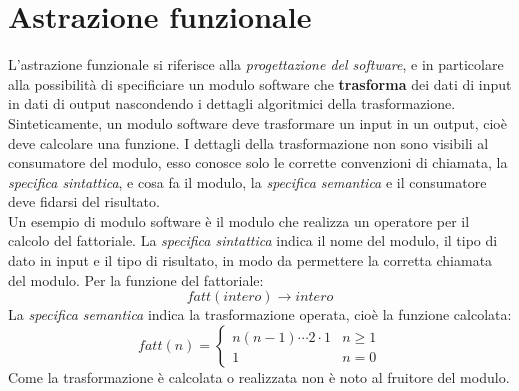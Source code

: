 \documentclass[12pt]{report}
\begin{document}
	\section{Astrazione funzionale}
	L'astrazione funzionale si riferisce alla \textit{progettazione del software}, e in particolare alla possibilità di specificiare un modulo software che \textbf{trasforma} dei dati di input in dati di output nascondendo i dettagli algoritmici della trasformazione. \\
	Sinteticamente, un modulo software deve trasformare un input in un output, cioè deve calcolare una funzione. I dettagli della trasformazione non sono visibili al consumatore del modulo, esso conosce solo le corrette convenzioni di chiamata, la \textit{specifica sintattica}, e cosa fa il modulo, la \textit{specifica semantica} e il consumatore deve fidarsi del risultato. \\
	Un esempio di modulo software è il modulo che realizza un operatore per il calcolo del fattoriale. La \textit{specifica sintattica} indica il nome del modulo, il tipo di dato in input e il tipo di risultato, in modo da permettere la corretta chiamata del modulo. Per la funzione del fattoriale:
	\[
	fatt(intero) \to intero
	\]
	La \textit{specifica semantica} indica la trasformazione operata, cioè la funzione calcolata:
	\[
	fatt(n) = \begin{cases}
		n(n-1)\cdots2\cdot1 & n \geq 1 \\
		1 & n=0
	\end{cases}
	\]
	Come la trasformazione è calcolata o realizzata non è noto al fruitore del modulo.
\end{document}
